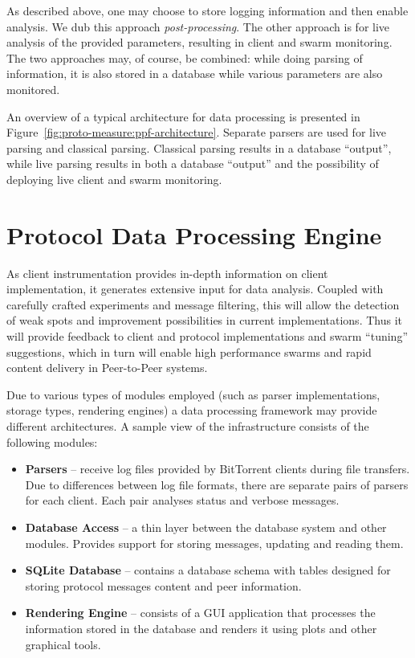 As described above, one may choose to store logging information and then
enable analysis. We dub this approach \textit{post-processing}. The other
approach is for live analysis of the provided parameters, resulting in client
and swarm monitoring. The two approaches may, of course, be combined: while
doing parsing of information, it is also stored in a database while various
parameters are also monitored.

An overview of a typical architecture for data processing is presented in
Figure~\ref{fig:proto-measure:ppf-architecture}. Separate parsers are used for live parsing and
classical parsing. Classical parsing results in a database ``output'', while
live parsing results in both a database ``output'' and the possibility of
deploying live client and swarm monitoring.

\section{Protocol Data Processing Engine}
\label{sec:proto-measure:data-processing}

As client instrumentation provides in-depth information on client
implementation, it generates extensive input for data analysis. Coupled
with carefully crafted experiments and message filtering, this will allow
the detection of weak spots and improvement possibilities in current
implementations. Thus it will provide feedback to client and protocol
implementations and swarm ``tuning'' suggestions, which in turn will enable
high performance swarms and rapid content delivery in Peer-to-Peer systems.

Due to various types of modules employed (such as parser implementations,
storage types, rendering engines) a data processing framework may provide
different architectures. A sample view of the infrastructure consists of the
following modules:

\begin{itemize}
  \item \textbf{Parsers} -- receive log files provided by BitTorrent
clients during file transfers. Due to differences between log file formats,
there are separate pairs of parsers for each client. Each pair analyses status
and verbose messages.
  \item \textbf{Database Access} -- a thin layer between the database system and
other modules. Provides support for storing messages, updating and reading
them.
  \item \textbf{SQLite Database} -- contains a database schema with tables
designed for storing protocol messages content and peer information.
  \item \textbf{Rendering Engine} -- consists of a GUI application that
processes the information stored in the database and renders it using plots
and other graphical tools.
\end{itemize}

